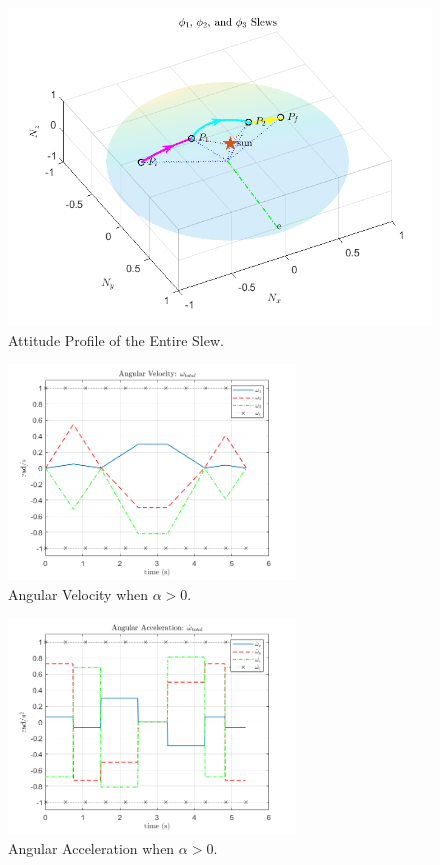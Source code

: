 \documentclass[letterpaper, preprint, paper,11pt]{AAS}	%
\begin{document}
			\begin{figure}[H]
				\begin{center}
					\includegraphics[width=4.75in]{figures/alphaNot0/phi1_phi2_phi3.png}
					\caption{Attitude Profile of the Entire Slew.}
					\label{fig:phi1_phi2_phi3}
				\end{center}		
			\end{figure}	
		
	\begin{multicols}{2}
		\begin{figure}[H]
			\begin{center}
			\includegraphics[width=3in]{figures/alphaNot0/ang_vel_phi_total.png}
			\caption{Angular Velocity when $\alpha>0$.}
			\end{center}
			\label{fig:ang_vel_phi_total}
		\end{figure}
	\columnbreak
		\begin{figure}[H]
			\begin{center}
				\includegraphics[width=3in]{figures/alphaNot0/ang_accel_total.png}
				\caption{Angular Acceleration when $\alpha>0$.}
			\end{center}
		\label{fig:ang_accel_total}
		\end{figure}
	\end{multicols}
	
\end{document}
